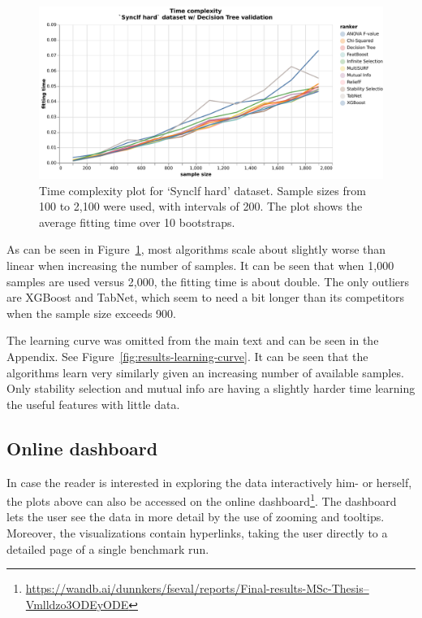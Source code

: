 \documentclass[../main.tex]{subfiles}
\begin{document}
\begin{figure}[ht]
    \centering
    \includegraphics[width=\linewidth]{report/images/results-time-complexity.pdf}
    \caption{Time complexity plot for `Synclf hard' dataset. Sample sizes from 100 to 2,100 were used, with intervals of 200. The plot shows the average fitting time over 10 bootstraps.}
    \label{fig:results-time-complexity}
\end{figure}

As can be seen in Figure~\ref{fig:results-time-complexity}, most algorithms scale about slightly worse than linear when increasing the number of samples. It can be seen that when 1,000 samples are used versus 2,000, the fitting time is about double. The only outliers are XGBoost and TabNet, which seem to need a bit longer than its competitors when the sample size exceeds 900.

The learning curve was omitted from the main text and can be seen in the Appendix. See Figure~\ref{fig:results-learning-curve}. It can be seen that the algorithms learn very similarly given an increasing number of available samples. Only stability selection and mutual info are having a slightly harder time learning the useful features with little data.

\subsection{Online dashboard}
In case the reader is interested in exploring the data interactively him- or herself, the plots above can also be accessed on the online dashboard\footnote{\href{https://wandb.ai/dunnkers/fseval/reports/Final-results-MSc-Thesis--Vmlldzo3ODEyODE}{https://wandb.ai/dunnkers/fseval/reports/Final-results-MSc-Thesis--Vmlldzo3ODEyODE}}. The dashboard lets the user see the data in more detail by the use of zooming and tooltips. Moreover, the visualizations contain hyperlinks, taking the user directly to a detailed page of a single benchmark run.

\biblio
\end{document}

